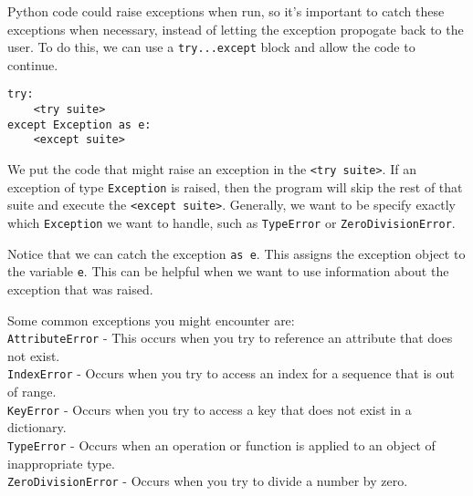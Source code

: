 Python code could raise exceptions when run, so it's important to catch these exceptions when necessary, instead of letting the exception propogate back to the user. To do this, we can use a \texttt{try...except} block and allow the code to continue.

\begin{lstlisting}
try:
    <try suite>
except Exception as e:
    <except suite>
\end{lstlisting}

We put the code that might raise an exception in the \texttt{<try suite>}. If an exception of type \texttt{Exception} is raised, then the program will skip the rest of that suite and execute the \texttt{<except suite>}. Generally, we want to be specify exactly which \texttt{Exception} we want to handle, such as \texttt{TypeError} or \texttt{ZeroDivisionError}.

Notice that we can catch the exception \texttt{as e}. This assigns the exception object to the variable \texttt{e}. This can be helpful when we want to use information about the exception that was raised.

Some common exceptions you might encounter are: \\
\texttt{AttributeError} - This occurs when you try to reference an attribute that does not exist. \\
\texttt{IndexError} - Occurs when you try to access an index for a sequence that is out of range. \\
\texttt{KeyError} - Occurs when you try to access a key that does not exist in a dictionary. \\
\texttt{TypeError} - Occurs when an operation or function is applied to an object of inappropriate type. \\
\texttt{ZeroDivisionError} - Occurs when you try to divide a number by zero. 

